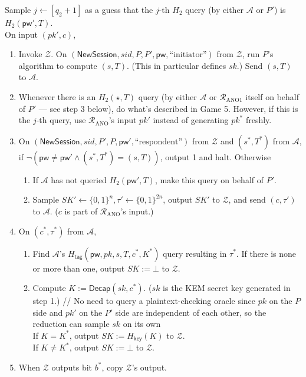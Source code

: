 \documentclass{article}
\theoremstyle{plain}
\theoremstyle{definition}
\theoremstyle{remark}
\newcommand{\adv}{\mathcal{A}}
\newcommand{\env}{\mathcal{Z}}
\newcommand{\red}{\mathcal{R}}
\newcommand{\Decap}{\mathsf{Decap}}
\newcommand{\Hkey}{H_\mathsf{key}}
\newcommand{\Htag}{H_\mathsf{tag}}
\newcommand{\pw}{\mathsf{pw}}
\newcommand{\NewSession}{\mathsf{NewSession}}
\begin{document}
\medskip\noindent
Sample $j \gets [q_2+1]$ as a guess that the $j$-th $H_2$ query (by either $\adv$ or $P'$) is $H_2(\pw',T)$. \\
On input $(pk',c)$,
\begin{enumerate}
  \item Invoke $\env$. On $(\NewSession, sid, P, P', \pw, \text{``initiator''})$ from $\env$, run $P$'s algorithm to compute $(s,T)$. (This in particular defines $sk$.) Send $(s,T)$ to $\adv$.
  \item Whenever there is an $H_2(\star,T)$ query (by either $\adv$ or $\red_\mathrm{ANO1}$ itself on behalf of $P'$ --- see step 3 below), do what's described in Game 5. However, if this is the $j$-th query, use $\red_\mathrm{ANO}$'s input $pk'$ instead of generating $pk^*$ freshly.
  \item On $(\NewSession, sid, P', P, \pw', \text{``respondent''})$ from $\env$ and $(s^*,T^*)$ from $\adv$, if $\neg(\pw \neq \pw' \land (s^*,T^*) = (s,T))$, output 1 and halt. Otherwise
      \begin{enumerate}
        \item If $\adv$ has not queried $H_2(\pw',T)$, make this query on behalf of $P'$.
        \item Sample $SK' \gets \{0,1\}^n,\tau' \gets \{0,1\}^{2n}$, output $SK'$ to $\env$, and send $(c,\tau')$ to $\adv$. ($c$ is part of $\red_\text{ANO}$'s input.)
      \end{enumerate}
  \item On $(c^*,\tau^*)$ from $\adv$,
      \begin{enumerate}
        \item Find $\adv$'s $\Htag(\pw,pk,s,T,c^*,K^*)$ query resulting in $\tau^*$. If there is none or more than one, output $SK := \bot$ to $\env$.
        \item Compute $K := \Decap(sk,c^*)$. ($sk$ is the KEM secret key generated in step 1.) \quad \textcolor[gray]{0.5}{// No need to query a plaintext-checking oracle since $pk$ on the $P$ side and $pk'$ on the $P'$ side are independent of each other, so the reduction can sample $sk$ on its own} \\
            If $K = K^*$, output $SK := \Hkey(K)$ to $\env$. \\
            If $K \neq K^*$, output $SK := \bot$ to $\env$.
      \end{enumerate}
  \item {\color{blue}When $\env$ outputs bit $b^*$, copy $\env$'s output.}
\end{enumerate}
\end{document}
